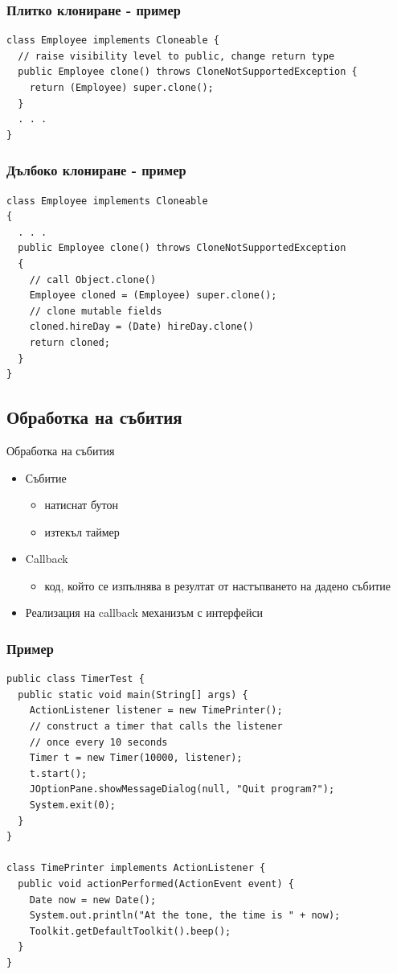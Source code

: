 \documentclass{beamer}
\begin{document}
\begin{frame}[fragile]
  \frametitle{Плитко клониране - пример}
  
\begin{lstlisting}
class Employee implements Cloneable {
  // raise visibility level to public, change return type
  public Employee clone() throws CloneNotSupportedException {
    return (Employee) super.clone();
  }
  . . .
}
\end{lstlisting}
\end{frame}

\begin{frame}[fragile]
  \frametitle{Дълбоко клониране - пример}
  
\begin{lstlisting}
class Employee implements Cloneable
{
  . . .
  public Employee clone() throws CloneNotSupportedException
  {
    // call Object.clone()
    Employee cloned = (Employee) super.clone();
    // clone mutable fields
    cloned.hireDay = (Date) hireDay.clone()
    return cloned;
  }
}  
\end{lstlisting}
\end{frame}

\subsection{Обработка на събития}
\begin{frame}{Обработка на събития}
  
  \begin{itemize}
  \item Събитие 
    \begin{itemize}
      \item натиснат бутон 
      \item изтекъл таймер 
    \end{itemize}
  \item Callback
    \begin{itemize}
      \item код, който се изпълнява в резултат от настъпването на
        дадено събитие 
    \end{itemize}
  \item Реализация на callback механизъм с интерфейси
  \end{itemize}
\end{frame}

\begin{frame}[fragile]
  \frametitle{Пример}
  
\begin{lstlisting}[basicstyle=\tiny]
public class TimerTest {
  public static void main(String[] args) {
    ActionListener listener = new TimePrinter();
    // construct a timer that calls the listener
    // once every 10 seconds
    Timer t = new Timer(10000, listener);
    t.start();
    JOptionPane.showMessageDialog(null, "Quit program?");
    System.exit(0);
  }
}

class TimePrinter implements ActionListener {
  public void actionPerformed(ActionEvent event) {
    Date now = new Date();
    System.out.println("At the tone, the time is " + now);
    Toolkit.getDefaultToolkit().beep();
  }
}
\end{lstlisting}
\end{frame}
\end{document}
